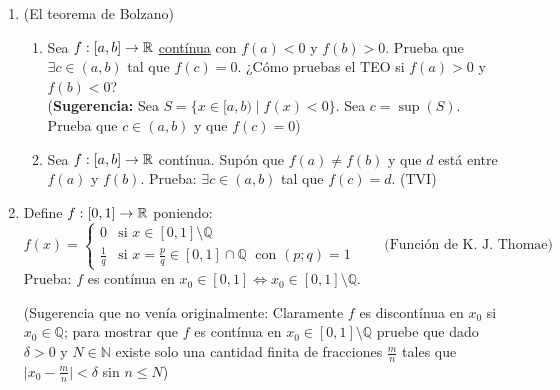 \documentclass{article}
\newcommand{\N}{\mathbb{N}}
\begin{document}
\begin{enumerate}
    \begin{enumerate}
        \item $E$ es \underline{cerrado y acotado} (en $\R^{p}$) \textit{i.e} $E$ es compacto (H--B).
        \item Identifica $T(E)$.
        \item Obtén $x^{*}, x_{*} \in E$ tales que $T(x^{*})=\sup\{T(\mathbf{x}) \mid \mathbf{x} \in E\}$ y $T(x_{*})=\inf\{T(\mathbf{x}) \mid \mathbf{x} \in E\}$ \\ (\textbf{Sugerencia:} T es \underline{lineal} \& $T$ es contínua; $T(-\mathbf{x})=-T(\mathbf{x}) \; \forall \mathbf{x}$. $K$ y $E$son convexos$\implies T(K)$ y $T(E)$ son convexos en $\R$, cerrados, acotados y simétricos. Puedes usar multiplicadores de Lagrange)
    \end{enumerate}
    \item (El teorema de Bolzano)
    \begin{enumerate}
        \item Sea $f:[a,b] \to \mathbb{R}$ \underline{contínua} con $f(a)<0$ y $f(b)>0$. Prueba que $\exists c \in (a,b)$ tal que $f(c)=0$. ¿Cómo pruebas el TEO si $f(a)>0$ y $f(b)<0$? \\ (\textbf{Sugerencia:} Sea $S=\{x \in [a,b) \mid f(x)<0\}$. Sea $c=\sup(S)$. Prueba que $c\in (a,b)$ y que $f(c)=0$)
        \item Sea $f:[a,b] \to \mathbb{R}$ contínua. Supón que $f(a)\neq f(b)$ y que $d$ está entre $f(a)$ y $f(b)$. Prueba: $\exists c \in (a,b)$ tal que $f(c)=d$. \qquad (TVI)
    \end{enumerate}
    \item Define $f:[0,1] \to \mathbb{R}$ poniendo: \begin{equation*}
        f(x) = 
        \begin{cases}
            0 & \text{si } \displaystyle x\in[0,1]\setminus\mathbb{Q} \\
            \displaystyle \frac{1}{q} & \text{si } \displaystyle x=\frac{p}{q} \in [0,1]\cap \mathbb{Q} \; \text{ con } (p;q)=1
        \end{cases}
        \qquad \text{(Función de K. J. Thomae)}
    \end{equation*}
    Prueba: $f$ es contínua en $x_{0} \in [0,1] \iff x_{0} \in [0,1]\setminus \mathbb{Q}$.

    (Sugerencia que no venía originalmente: Claramente $f$ es discontínua en $x_{0}$ si $x_{0} \in \mathbb{Q}$; para mostrar que $f$ es contínua en $x_{0}\in[0,1]\setminus \mathbb{Q}$ pruebe que dado $\delta > 0$ y $N \in \N$ existe solo una cantidad finita de fracciones $\frac{m}{n}$ tales que $\Big| x_{0} - \frac{m}{n} \Big| < \delta$ sin $n \leq N$)


\end{enumerate}
\end{document}
